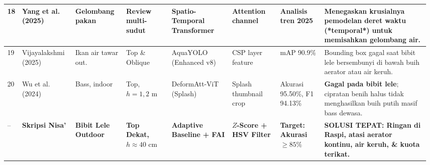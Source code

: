 \documentclass[10pt,a4paper]{article}
\providecommand{\text}[1]{\mbox{#1}}
\begin{document}
{\begin{center}
\begin{tabular}{|p{0.35cm}|p{2.2cm}|p{2.0cm}|p{1.5cm}|p{2.3cm}|p{2.0cm}|p{1.8cm}|p{4.7cm}|}
\hline
18 & Yang et al. (2025) & Gelombang pakan & Review multi-sudut & Spatio-Temporal Transformer & Attention channel & Analisis tren 2025 & Menegaskan krusialnya pemodelan deret waktu (*temporal*) untuk memisahkan gelombang air. \\
\hline
19 & Vijayalakshmi (2025) & Ikan air tawar out. & Top \& Oblique & AquaYOLO (Enhanced v8) & CSP layer feature & mAP 90.9\% & Bounding box gagal saat bibit lele bersembunyi di bawah buih aerator atau air keruh. \\
\hline
20 & Wu et al. (2024) & Bass, indoor & Top, $h=1,2\text{ m}$ & DeformAtt-ViT (Splash) & Splash thumbnail crop & Akurasi 95.50\%, F1 94.13\% & \textbf{Gagal pada bibit lele}; cipratan benih halus tidak menghasilkan buih putih masif bass dewasa. \\
\hline
-- & \textbf{Skripsi Nisa'} & \textbf{Bibit Lele Outdoor} & \textbf{Top Dekat, $h \approx 40\text{ cm}$} & \textbf{Adaptive Baseline + FAI} & \textbf{$Z$-Score + HSV Filter} & \textbf{Target: Akurasi $\ge 85\%$} & \textbf{SOLUSI TEPAT: Ringan di Raspi, atasi aerator kontinu, air keruh, \& kuota terikat.} \\
\hline
\end{tabular}
\end{center}
}

\newpage
\end{document}
